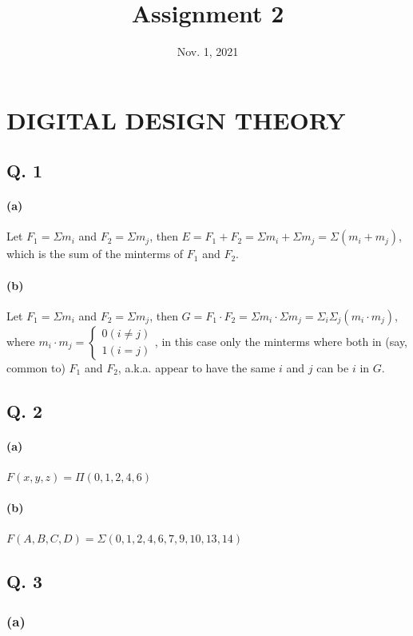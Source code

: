 \documentclass[onecolumn, oneside, ctexart]{SUSTechHomework}
\title{Assignment 2}
\date{Nov. 1, 2021}
\begin{document}
  \maketitle
  \section{DIGITAL DESIGN THEORY}
\subsection*{Q. 1}
\paragraph{(a)}
Let $F_1=\Sigma m_{i}$ and $F_2=\Sigma m_{j}$, then $E=F_1+F_2=\Sigma m_{i}+\Sigma m_{j}=\Sigma (m_{i}+m_{j})$, which is the sum of the minterms of $F_1$ and $F_2$.
\vspace{-1em}
\paragraph{(b)}
Let $F_1=\Sigma m_{i}$ and $F_2=\Sigma m_{j}$, then $G=F_1\cdot F_2=\Sigma m_{i}\cdot \Sigma m_{j}=\Sigma_i\Sigma_j(m_i\cdot m_j)$, where $m_i\cdot m_j=\left\{
\begin{aligned}
0(i\not=j)\\
1(i=j)
\end{aligned}
\right.$, in this case only the minterms where both in (say, common to) $F_1$ and $F_2$, a.k.a. appear to have the same $i$ and $j$ can be $i$ in $G$.

\subsection*{Q. 2}
\paragraph{(a)}
$F(x,y,z)=\Pi(0,1,2,4,6)$
\vspace{-1em}
\paragraph{(b)}
$F(A,B,C,D)=\Sigma(0,1,2,4,6,7,9,10,13,14)$

\subsection*{Q. 3}
\subsubsection*{(a)}
\end{document}
